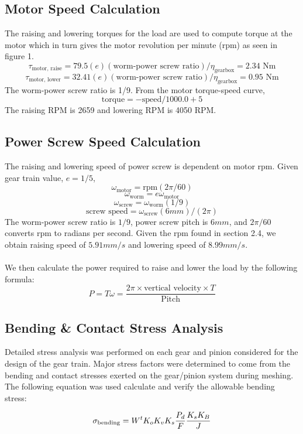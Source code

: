\documentclass[letterpaper,12pt]{article}
\begin{document}
\subsection{Motor Speed Calculation}
The raising and lowering torques for the load are used to compute torque at the motor which in turn gives the motor revolution per minute (rpm) as seen in figure 1. 
$$\tau_{\text{motor, raise}} = 79.5 (e)(\text{worm-power screw ratio}) / \eta_{\text{gearbox}} = 2.34 \text{ Nm}$$
$$\tau_{\text{motor, lower}} = 32.41 (e)(\text{worm-power screw ratio}) / \eta_{\text{gearbox}} = 0.95 \text{ Nm}$$
The worm-power screw ratio is 1/9. From the motor torque-speed curve, $$\text{torque} = -\text{speed}/1000.0+5$$ The raising RPM is 2659 and lowering RPM is 4050 RPM. 

\subsection{Power Screw Speed Calculation}
The raising and lowering speed of power screw is dependent on motor rpm. Given gear train value, $e = 1/5$, 
$$\omega_{\text{motor}} = \text{rpm} (2\pi/60)$$
$$\omega_{\text{worm}} = e \omega_{\text{motor}}$$
$$\omega_{\text{screw}} = \omega_{\text{worm}} (1/9)$$
$$\text{screw speed} = \omega_{\text{screw}}(6mm)/ (2 \pi)$$
The worm-power screw ratio is $1/9$, power screw pitch is $6mm$, and $2\pi/60$ converts rpm to radians per second. Given the rpm found in section 2.4, we obtain raising speed of $5.91 mm/s$ and lowering speed of $8.99 mm/s$. \\\\
We then calculate the power required to raise and lower the load by the following formula:
\begin{equation}
    P = T \omega = \dfrac{2\pi \times \text{vertical velocity} \times T}{\text{Pitch}}
\end{equation}
\subsection{Bending \& Contact Stress Analysis}

Detailed stress analysis was performed on each gear and pinion considered for the design of the gear train. Major stress factors were determined to come from the bending and contact stresses exerted on the gear/pinion system during meshing. The following equation was used calculate and verify the allowable bending stress:

\begin{equation}
\sigma_{\text{bending}} = W^t K_o K_v K_s \frac{P_d}{F}\frac{K_s K_B}{J} \\
\end{equation}
\end{document}
